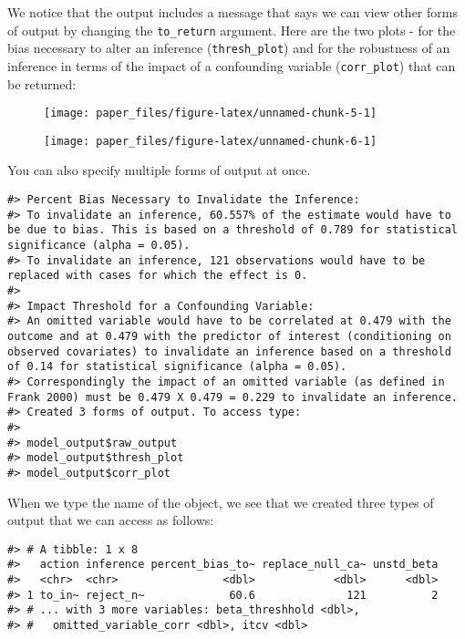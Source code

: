 \documentclass[man]{apa6}
\begin{document}
We notice that the output includes a message that says we can view other
forms of output by changing the \texttt{to\_return} argument. Here are
the two plots - for the bias necessary to alter an inference
(\texttt{thresh\_plot}) and for the robustness of an inference in terms
of the impact of a confounding variable (\texttt{corr\_plot}) that can
be returned:

\begin{figure}

{\centering \texttt{[image: paper\_files/figure-latex/unnamed-chunk-5-1]} 

}

\caption{ }\label{fig:unnamed-chunk-5}
\end{figure}

\begin{figure}

{\centering \texttt{[image: paper\_files/figure-latex/unnamed-chunk-6-1]} 

}

\caption{ }\label{fig:unnamed-chunk-6}
\end{figure}

You can also specify multiple forms of output at once.

\begin{verbatim}
#> Percent Bias Necessary to Invalidate the Inference:
#> To invalidate an inference, 60.557% of the estimate would have to be due to bias. This is based on a threshold of 0.789 for statistical significance (alpha = 0.05).
#> To invalidate an inference, 121 observations would have to be replaced with cases for which the effect is 0.
#> 
#> Impact Threshold for a Confounding Variable:
#> An omitted variable would have to be correlated at 0.479 with the outcome and at 0.479 with the predictor of interest (conditioning on observed covariates) to invalidate an inference based on a threshold of 0.14 for statistical significance (alpha = 0.05).
#> Correspondingly the impact of an omitted variable (as defined in Frank 2000) must be 0.479 X 0.479 = 0.229 to invalidate an inference.
#> Created 3 forms of output. To access type: 
#> 
#> model_output$raw_output
#> model_output$thresh_plot
#> model_output$corr_plot
\end{verbatim}

When we type the name of the object, we see that we created three types
of output that we can access as follows:

\begin{verbatim}
#> # A tibble: 1 x 8
#>   action inference percent_bias_to~ replace_null_ca~ unstd_beta
#>   <chr>  <chr>                <dbl>            <dbl>      <dbl>
#> 1 to_in~ reject_n~             60.6              121          2
#> # ... with 3 more variables: beta_threshhold <dbl>,
#> #   omitted_variable_corr <dbl>, itcv <dbl>
\end{verbatim}
\end{document}
